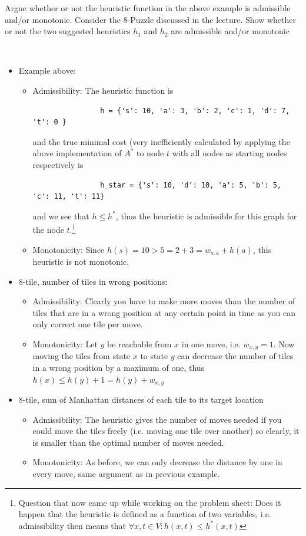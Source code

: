 \documentclass{article}
\begin{document}
\begin{exercise}
    Argue whether or not the heuristic function in the above example is admissible and/or monotonic. Consider the $8$-Puzzle discussed in the lecture. Show whether or not the two suggested heuristics $h_1$ and $h_2$ are admissible and/or monotonic
\end{exercise}
\begin{solving}~
\begin{itemize}
    \item Example above:
        \begin{itemize}
            \item Admissibility: The heuristic function is 
            \begin{verbatim}
                h = {'s': 10, 'a': 3, 'b': 2, 'c': 1, 'd': 7, 't': 0 }\end{verbatim}
            and the true minimal cost (very inefficiently calculated by applying the above implementation of $A^*$ to node $t$ with all nodes as starting nodes respectively is \begin{verbatim}
                h_star = {'s': 10, 'd': 10, 'a': 5, 'b': 5, 'c': 11, 't': 11}\end{verbatim}
            and we see that $h\leq h^*$, thus the heuristic is admissible for this graph for the node $t$.\footnote{Question that now came up while working on the problem sheet: Does it happen that the heuristic is defined as a function of two variables, i.e. admissibility then means that $\forall x,t \in V: h(x,t)\leq h^*(x,t)$}
            \item Monotonicity: Since $h(s) = 10 > 5 = 2+3 = w_{s,a} +  h(a)$, this heuristic is not monotonic.
    \end{itemize}
    \item 8-tile, number of tiles in wrong positions:
    \begin{itemize}
        \item Admissibility: Clearly you have to make more moves than the number of tiles that are in a wrong position at any certain point in time as you can only correct one tile per move.
        \item Monotonicity: Let $y$ be reachable from $x$ in one move, i.e. $w_{x,y} = 1$. Now moving the tiles from state $x$ to state $y$ can decrease the number of tiles in a wrong position by a maximum of one, thus $h(x) \leq h(y) + 1  = h(y) + w_{x,y}$
    \end{itemize}
    \item 8-tile, sum of Manhattan distances of each tile to its target location \begin{itemize}
        \item Admissibility: The heuristic gives the number of moves needed if you could move the tiles freely (i.e. moving one tile over another) so clearly, it is smaller than the optimal number of moves needed.
        \item Monotonicity: As before, we can only decrease the distance by one in every move, same argument as in previous example.
    \end{itemize}
\end{itemize}
    
\end{solving}
\end{document}
